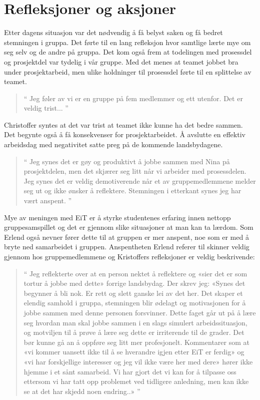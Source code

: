 \section{Refleksjoner og aksjoner}

Etter dagens situasjon var det nødvendig å få belyst saken og få bedret stemningen i gruppa. Det førte til en lang
refleksjon hvor samtlige lærte mye om seg selv og de andre på gruppa. Det kom også frem at todelingen med prosessdel
og prosjektdel var tydelig i vår gruppe. Med det menes at teamet jobbet bra under prosjektarbeid, men ulike holdninger
til prosessdel førte til en splittelse av teamet. 

\begin{quote}``
Jeg føler av vi er en gruppe på fem medlemmer og ett utenfor. Det er veldig trist...
''\end{quote} 

Christoffer syntes at det var trist at teamet ikke kunne ha det bedre sammen. Det begynte også å få konsekvenser
for prosjektarbeidet. Å avslutte en effektiv arbeidsdag med negativitet satte preg på de kommende landsbydagene.

\begin{quote}``
Jeg synes det er gøy og produktivt å jobbe sammen med Nina på prosjektdelen, men det skjærer seg litt når vi 
arbeider med prosessdelen. Jeg synes det er veldig demotiverende når et av gruppemedlemmene melder seg ut 
og ikke ønsker å reflektere. Stemningen i etterkant synes jeg har vært anspent.
''\end{quote} 

Mye av meningen med EiT er å styrke studentenes erfaring innen nettopp gruppesamspillet og det er gjennom
slike situasjoner at man kan ta lærdom. 
Som Erlend også nevner fører dette til at gruppen er mer anspent, noe som er med å bryte ned samarbeidet i 
gruppen. Anspentheten Erlend referer til skinner veldig gjennom hos gruppemedlemmene og Kristoffers refleksjoner 
er veldig beskrivende:

\begin{quote}``
Jeg reflekterte over at en person nektet å reflektere og «sier det er som tortur å jobbe med dette» forrige 
landsbydag. Der skrev jeg: «Synes det begynner å bli nok. Er rett og slett ganske lei av det her. Det skaper et 
elendig samhold i gruppa, stemningen blir ødelagt og motivasjonen for å jobbe sammen med denne personen 
forsvinner. Dette faget går ut på å lære seg hvordan man skal jobbe sammen i en slags simulert arbeidssituasjon, 
og motviljen til å prøve å lære seg dette er irriterende til de grader. Det bør kunne gå an å oppføre seg litt mer 
profesjonelt. Kommentarer som at «vi kommer uansett ikke til å se hverandre igjen etter EiT er ferdig» og «vi har 
forskjellige interesser og jeg vil ikke være her med dere» hører ikke hjemme i et sånt samarbeid. Vi har gjort det 
vi kan for å tilpasse oss ettersom vi har tatt opp problemet ved tidligere anledning, men kan ikke se at det har 
skjedd noen endring..» 
''\end{quote} 

